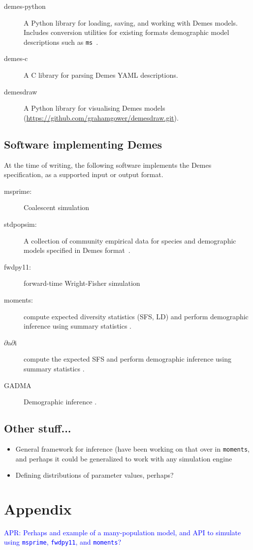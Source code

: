 \documentclass[11pt]{article}
\newcommand{\msprime}[0]{\texttt{msprime}}
\newcommand{\moments}[0]{\texttt{moments}}
\newcommand{\fwdpy}[0]{\texttt{fwdpy11}}
\newcommand{\aprcomment}[1]{{\textcolor{blue}{APR: #1}}}
\begin{document}
\begin{description}
    \item[demes-python] A Python library for loading, saving, and working with
        Demes models. Includes conversion utilities for existing formats
        demographic model descriptions such as
        \texttt{ms}~\citep{hudson2002generating}.
    \item[demes-c] A C library for parsing Demes YAML descriptions.
    \item[demesdraw] A Python library for visualising Demes models
     (\url{https://github.com/grahamgower/demesdraw.git}).
\end{description}


\subsection*{Software implementing Demes}
At the time of writing, the following software implements the Demes
specification, as a supported input or output format.

\begin{description}
    \item[msprime:] Coalescent simulation
        \citep{kelleher2016efficient,kelleher2020coalescent}
    \item[stdpopsim:] A collection of community empirical data for species
        and demographic models specified in Demes format~\citep{adrion2020community}.
    \item[fwdpy11:] forward-time Wright-Fisher simulation \citep{thornton2014c++}
    \item[moments:] compute expected diversity statistics (SFS, LD) and perform
        demographic inference using summary statistics
        \citep{jouganous2017inferring,ragsdale2019models}.
    \item[$\partial$a$\partial$i] compute the expected SFS and
        perform demographic inference using
        summary statistics \citep{gutenkunst2009inferring}.
    \item[GADMA] Demographic inference \citep{noskova2020gadma}.
\end{description}

\subsection*{Other stuff...}

\begin{itemize}
    \item General framework for inference (have been working on that over in \moments,
        and perhaps it could be generalized to work with any simulation engine
    \item Defining distributions of parameter values, perhaps?
\end{itemize}




\section*{Appendix}

\aprcomment{Perhaps and example of a many-population model, and API to simulate using
\msprime, \fwdpy, and \moments?}
\end{document}
